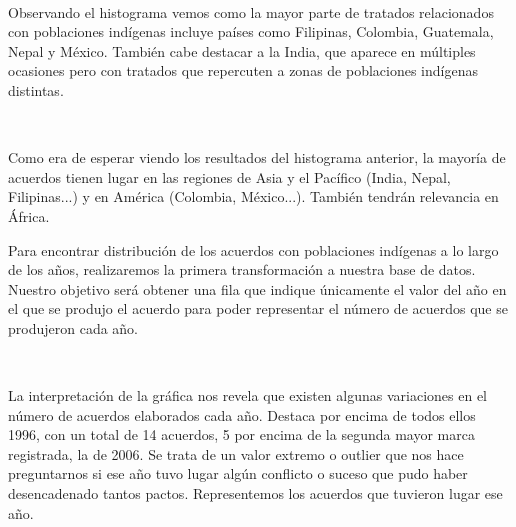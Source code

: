 \documentclass[11pt]{article}
\begin{document}
    \begin{center}
    \end{center}
    { \hspace*{\fill} \\}
    
    Observando el histograma vemos como la mayor parte de tratados
relacionados con poblaciones indígenas incluye países como Filipinas,
Colombia, Guatemala, Nepal y México. También cabe destacar a la India,
que aparece en múltiples ocasiones pero con tratados que repercuten a
zonas de poblaciones indígenas distintas.

    \begin{center}
    \end{center}
    { \hspace*{\fill} \\}
    
    Como era de esperar viendo los resultados del histograma anterior, la
mayoría de acuerdos tienen lugar en las regiones de Asia y el Pacífico
(India, Nepal, Filipinas...) y en América (Colombia, México...). También
tendrán relevancia en África.

    Para encontrar distribución de los acuerdos con poblaciones indígenas a
lo largo de los años, realizaremos la primera transformación a nuestra
base de datos. Nuestro objetivo será obtener una fila que indique
únicamente el valor del año en el que se produjo el acuerdo para poder
representar el número de acuerdos que se produjeron cada año.

    \begin{center}
    \end{center}
    { \hspace*{\fill} \\}
    
    La interpretación de la gráfica nos revela que existen algunas
variaciones en el número de acuerdos elaborados cada año. Destaca por
encima de todos ellos 1996, con un total de 14 acuerdos, 5 por encima de
la segunda mayor marca registrada, la de 2006. Se trata de un valor extremo
o outlier que nos hace preguntarnos si ese año tuvo lugar algún
conflicto o suceso que pudo haber desencadenado tantos pactos.
Representemos los acuerdos que tuvieron lugar ese año.

    \begin{center}
    \end{center}
    { \hspace*{\fill} \\}
    
\end{document}
